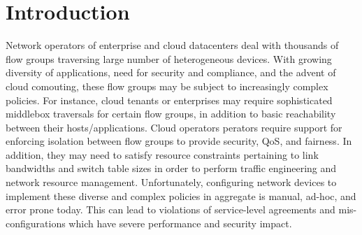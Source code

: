 \section{Introduction}

Network operators of enterprise and cloud datacenters deal with
thousands of flow groups traversing large number of heterogeneous
devices. With growing diversity of applications, need for security and
compliance, and the advent of cloud comouting, these flow groups may
be subject to increasingly complex policies. For instance, cloud
tenants or enterprises may require sophisticated middlebox traversals
for certain flow groups, in addition to basic reachability between
their hosts/applications. Cloud operators perators require support for
enforcing isolation between flow groups to provide security, QoS, and
fairness. In addition, they may need to satisfy resource constraints
pertaining to link bandwidths and switch table sizes in order to
perform traffic engineering and network resource management.
Unfortunately, configuring network devices to implement these diverse
and complex policies in aggregate is manual, ad-hoc, and error prone
today. This can lead to violations of service-level agreements and
mis-configurations which have severe performance and security impact.



